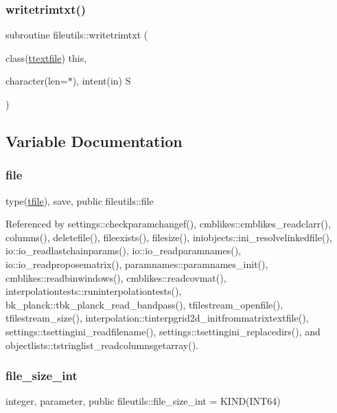 \mbox{\label{namespacefileutils_a1b72d4facdf945b9ab5d8cf747100c96}} 
\subsubsection{\texorpdfstring{writetrimtxt()}{writetrimtxt()}}
{\footnotesize\ttfamily subroutine fileutils\+::writetrimtxt (\begin{DoxyParamCaption}\item[{class(\mbox{\hyperlink{structfileutils_1_1ttextfile}{ttextfile}})}]{this,  }\item[{character(len=$\ast$), intent(in)}]{S }\end{DoxyParamCaption})\hspace{0.3cm}{\ttfamily [private]}}



\subsection{Variable Documentation}
\mbox{\label{namespacefileutils_a7a95a2141243385ca3ee3909016380ab}} 
\subsubsection{\texorpdfstring{file}{file}}
{\footnotesize\ttfamily type(\mbox{\hyperlink{structfileutils_1_1tfile}{tfile}}), save, public fileutils\+::file}



Referenced by settings\+::checkparamchangef(), cmblikes\+::cmblikes\+\_\+readclarr(), columns(), deletefile(), fileexists(), filesize(), iniobjects\+::ini\+\_\+resolvelinkedfile(), io\+::io\+\_\+readlastchainparams(), io\+::io\+\_\+readparamnames(), io\+::io\+\_\+readproposematrix(), paramnames\+::paramnames\+\_\+init(), cmblikes\+::readbinwindows(), cmblikes\+::readcovmat(), interpolationtests\+::runinterpolationtests(), bk\+\_\+planck\+::tbk\+\_\+planck\+\_\+read\+\_\+bandpass(), tfilestream\+\_\+openfile(), tfilestream\+\_\+size(), interpolation\+::tinterpgrid2d\+\_\+initfrommatrixtextfile(), settings\+::tsettingini\+\_\+readfilename(), settings\+::tsettingini\+\_\+replacedirs(), and objectlists\+::tstringlist\+\_\+readcolumnsgetarray().

\mbox{\label{namespacefileutils_a334ae57c14956bd4597df7a130f6e8a8}} 
\subsubsection{\texorpdfstring{file\+\_\+size\+\_\+int}{file\_size\_int}}
{\footnotesize\ttfamily integer, parameter, public fileutils\+::file\+\_\+size\+\_\+int = K\+I\+ND(I\+N\+T64)}

